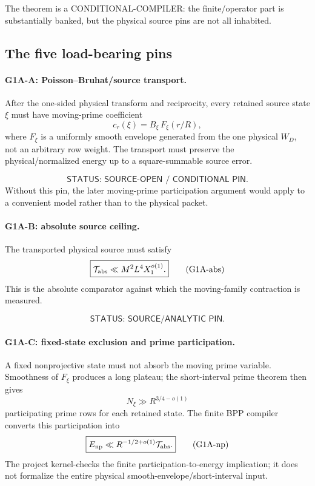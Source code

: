 \documentclass[11pt]{article}
\theoremstyle{definition}
\newcommand{\1}{\mathbf 1}
\newcommand{\status}[1]{\textsf{#1}}
\begin{document}
The theorem is a \status{CONDITIONAL-COMPILER}: the finite/operator part is substantially
banked, but the physical source pins are not all inhabited.

\subsection{The five load-bearing pins}

\paragraph{G1A-A: Poisson--Bruhat/source transport.}
After the one-sided physical transform and reciprocity, every retained source state
$\xi$ must have moving-prime coefficient
\[
\boxed{c_r(\xi)=B_\xi\,F_\xi(r/R),}
\tag{G1A-PB}
\]
where $F_\xi$ is a uniformly smooth envelope generated from the one physical $W_D$,
not an arbitrary row weight.  The transport must preserve the physical/normalized energy
up to a square-summable source error.

\[
\status{STATUS: SOURCE-OPEN / CONDITIONAL PIN.}
\]
Without this pin, the later moving-prime participation argument would apply to a convenient
model rather than to the physical packet.

\paragraph{G1A-B: absolute source ceiling.}
The transported physical source must satisfy
\[
\boxed{
\mathcal T_{\rm abs}
\ll
M^2L^4X_1^{o(1)}.
}
\tag{G1A-abs}
\]
This is the absolute comparator against which the moving-family contraction is measured.

\[
\status{STATUS: SOURCE/ANALYTIC PIN.}
\]

\paragraph{G1A-C: fixed-state exclusion and prime participation.}
A fixed nonprojective state must not absorb the moving prime variable.  Smoothness of
$F_\xi$ produces a long plateau; the short-interval prime theorem then gives
\[
\boxed{N_\xi\gg R^{3/4-o(1)}}
\tag{G1A-part}
\]
participating prime rows for each retained state.  The finite BPP compiler converts this
participation into
\[
\boxed{
E_{\rm np}
\ll
R^{-1/2+o(1)}\mathcal T_{\rm abs}.
}
\tag{G1A-np}
\]
The project kernel-checks the finite participation-to-energy implication; it does not
formalize the entire physical smooth-envelope/short-interval input.
\end{document}
